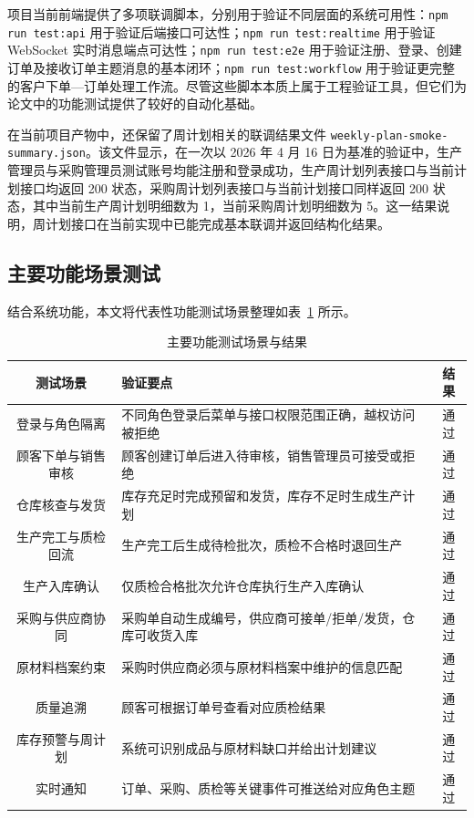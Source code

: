 项目当前前端提供了多项联调脚本，分别用于验证不同层面的系统可用性：\texttt{npm run test:api} 用于验证后端接口可达性；\texttt{npm run test:realtime} 用于验证 WebSocket 实时消息端点可达性；\texttt{npm run test:e2e} 用于验证注册、登录、创建订单及接收订单主题消息的基本闭环；\texttt{npm run test:workflow} 用于验证更完整的客户下单—订单处理工作流。尽管这些脚本本质上属于工程验证工具，但它们为论文中的功能测试提供了较好的自动化基础。

在当前项目产物中，还保留了周计划相关的联调结果文件 \texttt{weekly-plan-smoke-summary.json}。该文件显示，在一次以 2026 年 4 月 16 日为基准的验证中，生产管理员与采购管理员测试账号均能注册和登录成功，生产周计划列表接口与当前计划接口均返回 200 状态，采购周计划列表接口与当前计划接口同样返回 200 状态，其中当前生产周计划明细数为 1，当前采购周计划明细数为 5。这一结果说明，周计划接口在当前实现中已能完成基本联调并返回结构化结果。

\subsection{主要功能场景测试}

结合系统功能，本文将代表性功能测试场景整理如表~\ref{tab:function-test-real} 所示。

\begin{table}[htbp]
\centering
\footnotesize
\caption{主要功能测试场景与结果}
\label{tab:function-test-real}
\begin{tabular}{|c|p{5.4cm}|c|}
\hline
测试场景 & 验证要点 & 结果 \\\hline
登录与角色隔离 & 不同角色登录后菜单与接口权限范围正确，越权访问被拒绝 & 通过 \\\hline
顾客下单与销售审核 & 顾客创建订单后进入待审核，销售管理员可接受或拒绝 & 通过 \\\hline
仓库核查与发货 & 库存充足时完成预留和发货，库存不足时生成生产计划 & 通过 \\\hline
生产完工与质检回流 & 生产完工后生成待检批次，质检不合格时退回生产 & 通过 \\\hline
生产入库确认 & 仅质检合格批次允许仓库执行生产入库确认 & 通过 \\\hline
采购与供应商协同 & 采购单自动生成编号，供应商可接单/拒单/发货，仓库可收货入库 & 通过 \\\hline
原材料档案约束 & 采购时供应商必须与原材料档案中维护的信息匹配 & 通过 \\\hline
质量追溯 & 顾客可根据订单号查看对应质检结果 & 通过 \\\hline
库存预警与周计划 & 系统可识别成品与原材料缺口并给出计划建议 & 通过 \\\hline
实时通知 & 订单、采购、质检等关键事件可推送给对应角色主题 & 通过 \\\hline
\end{tabular}
\end{table}

